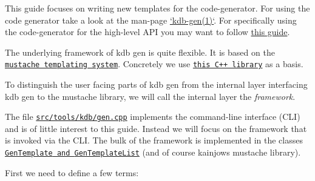 This guide focuses on writing new templates for the code-\/generator. For using the code generator take a look at the man-\/page \hyperlink{doc_help_kdb-gen_md}{`kdb-\/gen(1)`}. For specifically using the code-\/generator for the high-\/level A\+PI you may want to follow \hyperlink{doc_tutorials_highlevel_md}{this guide}.

The underlying framework of {\ttfamily kdb gen} is quite flexible. It is based on the \href{https://mustache.github.io/}{\tt mustache templating system}. Concretely we use \href{https://github.com/kainjow/Mustache}{\tt this C++ library} as a basis.

To distinguish the user facing parts of {\ttfamily kdb gen} from the internal layer interfacing {\ttfamily kdb gen} to the mustache library, we will call the internal layer the {\itshape framework}.

The file \href{/home/jenkins/workspace/libelektra-release/src/tools/kdb/gen.cpp}{\tt {\ttfamily src/tools/kdb/gen.\+cpp}} implements the command-\/line interface (C\+LI) and is of little interest to this guide. Instead we will focus on the framework that is invoked via the C\+LI. The bulk of the framework is implemented in the classes \href{/home/jenkins/workspace/libelektra-release/src/tools/kdb/gen/template.hpp}{\tt {\ttfamily Gen\+Template} and {\ttfamily Gen\+Template\+List}} (and of course kainjow\textquotesingle{}s mustache library).

First we need to define a few terms\+:



